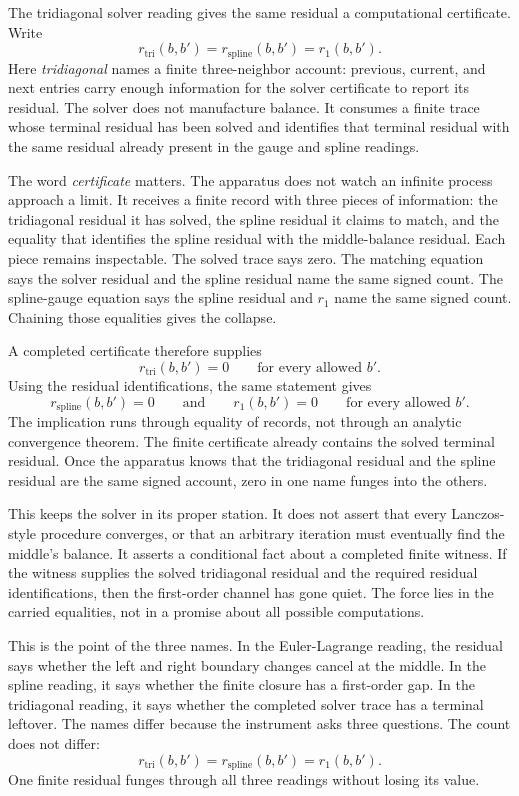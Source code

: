 The tridiagonal solver reading gives the same residual a computational certificate. Write
\[
  r_{\mathrm{tri}}(b,b')
  =
  r_{\mathrm{spline}}(b,b')
  =
  r_1(b,b').
\]
Here \emph{tridiagonal} names a finite three-neighbor account: previous, current, and next entries carry enough information for the solver certificate to report its residual. The solver does not manufacture balance. It consumes a finite trace whose terminal residual has been solved and identifies that terminal residual with the same residual already present in the gauge and spline readings.

The word \emph{certificate} matters. The apparatus does not watch an infinite process approach a limit. It receives a finite record with three pieces of information: the tridiagonal residual it has solved, the spline residual it claims to match, and the equality that identifies the spline residual with the middle-balance residual. Each piece remains inspectable. The solved trace says zero. The matching equation says the solver residual and the spline residual name the same signed count. The spline-gauge equation says the spline residual and $r_1$ name the same signed count. Chaining those equalities gives the collapse.

A completed certificate therefore supplies
\[
  r_{\mathrm{tri}}(b,b') = 0
  \qquad \text{for every allowed } b'.
\]
Using the residual identifications, the same statement gives
\[
  r_{\mathrm{spline}}(b,b') = 0
  \qquad\text{and}\qquad
  r_1(b,b') = 0
  \qquad \text{for every allowed } b'.
\]
The implication runs through equality of records, not through an analytic convergence theorem. The finite certificate already contains the solved terminal residual. Once the apparatus knows that the tridiagonal residual and the spline residual are the same signed account, zero in one name funges into the others.

This keeps the solver in its proper station. It does not assert that every Lanczos-style procedure converges, or that an arbitrary iteration must eventually find the middle's balance. It asserts a conditional fact about a completed finite witness. If the witness supplies the solved tridiagonal residual and the required residual identifications, then the first-order channel has gone quiet. The force lies in the carried equalities, not in a promise about all possible computations.

This is the point of the three names. In the Euler-Lagrange reading, the residual says whether the left and right boundary changes cancel at the middle. In the spline reading, it says whether the finite closure has a first-order gap. In the tridiagonal reading, it says whether the completed solver trace has a terminal leftover. The names differ because the instrument asks three questions. The count does not differ:
\[
  r_{\mathrm{tri}}(b,b')
  =
  r_{\mathrm{spline}}(b,b')
  =
  r_1(b,b').
\]
One finite residual funges through all three readings without losing its value.

